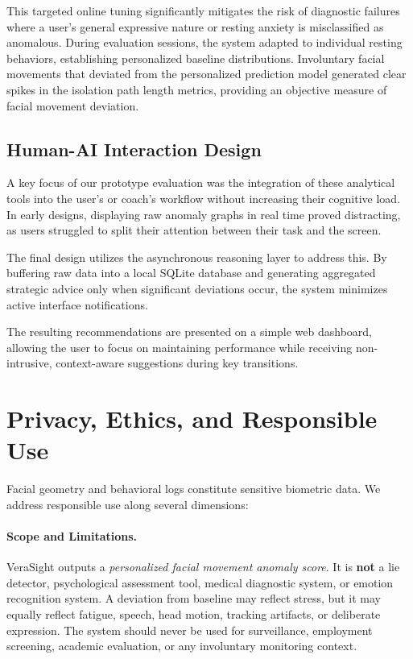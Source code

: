 \documentclass[sigconf]{acmart}
\begin{document}
This targeted online tuning significantly mitigates the risk of diagnostic failures where a user's general expressive nature or resting anxiety is misclassified as anomalous. During evaluation sessions, the system adapted to individual resting behaviors, establishing personalized baseline distributions. Involuntary facial movements that deviated from the personalized prediction model generated clear spikes in the isolation path length metrics, providing an objective measure of facial movement deviation.

\subsection{Human-AI Interaction Design}
A key focus of our prototype evaluation was the integration of these analytical tools into the user's or coach's workflow without increasing their cognitive load. In early designs, displaying raw anomaly graphs in real time proved distracting, as users struggled to split their attention between their task and the screen.

The final design utilizes the asynchronous reasoning layer to address this. By buffering raw data into a local SQLite database and generating aggregated strategic advice only when significant deviations occur, the system minimizes active interface notifications. 

The resulting recommendations are presented on a simple web dashboard, allowing the user to focus on maintaining performance while receiving non-intrusive, context-aware suggestions during key transitions.

\section{Privacy, Ethics, and Responsible Use}

Facial geometry and behavioral logs constitute sensitive biometric data. We address responsible use along several dimensions:

\paragraph{Scope and Limitations.}
VeraSight outputs a \emph{personalized facial movement anomaly score}. It is \textbf{not} a lie detector, psychological assessment tool, medical diagnostic system, or emotion recognition system. A deviation from baseline may reflect stress, but it may equally reflect fatigue, speech, head motion, tracking artifacts, or deliberate expression. The system should never be used for surveillance, employment screening, academic evaluation, or any involuntary monitoring context.
\end{document}
